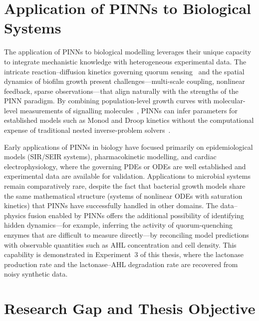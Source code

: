 \documentclass[14pt,a4paper,openany]{extbook}
\begin{document}
\section{Application of PINNs to Biological Systems}
\label{sec:pinnbio}

The application of PINNs to biological modelling leverages their unique capacity to integrate mechanistic knowledge with heterogeneous experimental data. The intricate reaction--diffusion kinetics governing quorum sensing~\cite{mukherjee2019bacterial} and the spatial dynamics of biofilm growth present challenges---multi-scale coupling, nonlinear feedback, sparse observations---that align naturally with the strengths of the PINN paradigm. By combining population-level growth curves with molecular-level measurements of signalling molecules~\cite{vanDitmarsch2011, buddrus2014analysis}, PINNs can infer parameters for established models such as Monod and Droop kinetics without the computational expense of traditional nested inverse-problem solvers~\cite{stanescu2009}.

Early applications of PINNs in biology have focused primarily on epidemiological models (SIR/SEIR systems), pharmacokinetic modelling, and cardiac electrophysiology, where the governing PDEs or ODEs are well established and experimental data are available for validation. Applications to microbial systems remain comparatively rare, despite the fact that bacterial growth models share the same mathematical structure (systems of nonlinear ODEs with saturation kinetics) that PINNs have successfully handled in other domains. The data--physics fusion enabled by PINNs offers the additional possibility of identifying hidden dynamics---for example, inferring the activity of quorum-quenching enzymes that are difficult to measure directly---by reconciling model predictions with observable quantities such as AHL concentration and cell density. This capability is demonstrated in Experiment~3 of this thesis, where the lactonase production rate and the lactonase--AHL degradation rate are recovered from noisy synthetic data.


\section{Research Gap and Thesis Objective}
\label{sec:gap}
\end{document}
